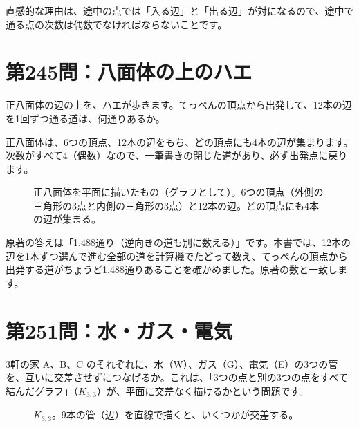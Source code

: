 \documentclass[a4paper,11pt,openany]{ltjsbook}
\begin{document}
直感的な理由は、途中の点では「入る辺」と「出る辺」が対になるので、途中で通る点の次数は偶数でなければならないことです。

\section{第245問：八面体の上のハエ}

正八面体の辺の上を、ハエが歩きます。てっぺんの頂点から出発して、12本の辺を1回ずつ通る道は、何通りあるか。

正八面体は、6つの頂点、12本の辺をもち、どの頂点にも4本の辺が集まります。次数がすべて4（偶数）なので、一筆書きの閉じた道があり、必ず出発点に戻ります。

\begin{figure}[htbp]
\centering
{}
\caption{正八面体を平面に描いたもの（グラフとして）。6つの頂点（外側の三角形の3点と内側の三角形の3点）と12本の辺。どの頂点にも4本の辺が集まる。}
\end{figure}

原著の答えは「1,488通り（逆向きの道も別に数える）」です。本書では、12本の辺を1本ずつ選んで進む全部の道を計算機でたどって数え、てっぺんの頂点から出発する道がちょうど1,488通りあることを確かめました。原著の数と一致します。

\section{第251問：水・ガス・電気}

3軒の家 A、B、C のそれぞれに、水（W）、ガス（G）、電気（E）の3つの管を、互いに交差させずにつなげるか。これは、「3つの点と別の3つの点をすべて結んだグラフ」（$K_{3,3}$）が、平面に交差なく描けるかという問題です。

\begin{figure}[htbp]
\centering
{}
\caption{$K_{3,3}$。9本の管（辺）を直線で描くと、いくつかが交差する。}
\end{figure}
\end{document}
